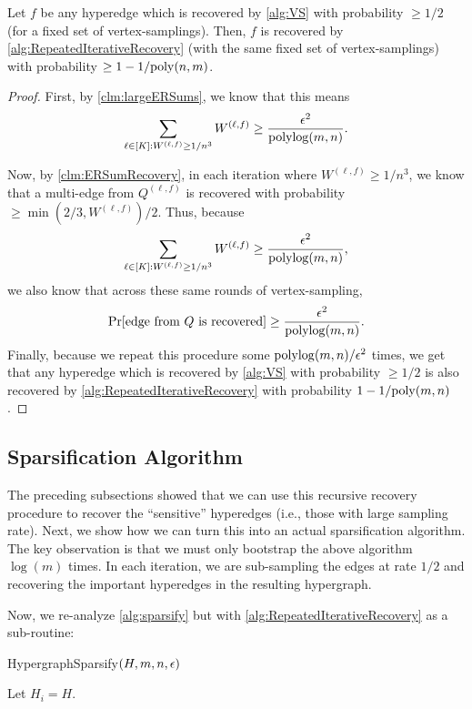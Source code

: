 \documentclass{article}
\begin{document}
\begin{lemma}\label{lem:RIRsame}
    Let $f$ be any hyperedge which is recovered by \cref{alg:VS} with probability $\geq 1/2$ (for a fixed set of vertex-samplings). Then, $f$ is recovered by \cref{alg:RepeatedIterativeRecovery} (with the same fixed set of vertex-samplings) with probability $\geq 1 - 1 / \mathrm{poly}(n,m)$.
\end{lemma}

\begin{proof}
    First, by \cref{clm:largeERSums}, we know that this means \[
    \sum_{\ell \in [K]: W^{(\ell, f)} \geq 1 / n^3} W^{(\ell, f)} \geq \frac{\epsilon^2}{\operatorname{polylog}(m,n)}.
    \]

    Now, by \cref{clm:ERSumRecovery}, in each iteration where $W^{(\ell, f)} \geq 1 / n^3$, we know that a multi-edge from $Q^{(\ell, f)}$ is recovered with probability $\geq \min(2/3, W^{(\ell, f)})/2$. Thus, because 
    \[
    \sum_{\ell \in [K]: W^{(\ell, f)} \geq 1 / n^3} W^{(\ell, f)} \geq \frac{\epsilon^2}{\operatorname{polylog}(m,n)},
    \]
    we also know that across these same rounds of vertex-sampling,
    \[
    \Pr[\text{edge from }Q \text{ is recovered}] \geq \frac{\epsilon^2}{\operatorname{polylog}(m,n)}.
    \]
    Finally, because we repeat this procedure some $\operatorname{polylog}(m,n) / \epsilon^2$ times, we get that any hyperedge which is recovered by \cref{alg:VS} with probability $\geq 1/2$ is also recovered by \cref{alg:RepeatedIterativeRecovery} with probability $1 - 1 / \mathrm{poly}(m,n)$.
\end{proof}

\subsection{Sparsification Algorithm}

The preceding subsections showed that we can use this recursive recovery procedure to recover the ``sensitive'' hyperedges (i.e., those with large sampling rate). Next, we show how we can turn this into an actual sparsification algorithm. The key observation is that we must only bootstrap the above algorithm $\log(m)$ times. In each iteration, we are sub-sampling the edges at rate $1/2$ and recovering the important hyperedges in the resulting hypergraph. 

Now, we re-analyze \cref{alg:sparsify} but with \cref{alg:RepeatedIterativeRecovery} as a sub-routine:

\begin{algorithm}[H]
\caption{HypergraphSparsify$(H, m, n , \epsilon)$}
\label{alg:finalSparsify}
Let $H_i = H$. \\
\end{algorithm}
\end{document}
